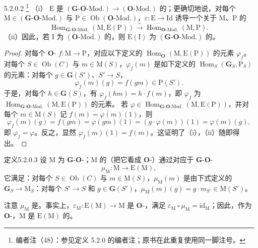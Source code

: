 \begin{SGAresult}{}{5.2.0.2}
\footnote{编者注（48）：参见定义 5.2.0 的编者注；原书在此重复使用同一脚注号。} （i） $\mathrm E$ 是 $(\mathbf G\text{-}\mathbf O\text{-}\mathrm{Mod.})\to(\mathbf O\text{-}\mathrm{Mod.})$ 的；更确切地说，对每个 $\mathrm M\in(\mathbf G\text{-}\mathbf O\text{-}\mathrm{Mod.})$ 与 $\mathrm P\in\operatorname{Ob}(\mathbf O\text{-}\mathrm{Mod.})$，$\varepsilon:\mathrm E\to\mathrm{Id}$ 诱导一个关于 $\mathrm M$、$\mathrm P$ 的
\[
\operatorname{Hom}_{\mathbf G\text{-}\mathbf O\text{-}\mathrm{Mod.}}(\mathrm M,\mathrm E(\mathrm P))\xrightarrow\sim\operatorname{Hom}_{\mathbf O\text{-}\mathrm{Mod.}}(\mathrm M,\mathrm P).
\]
（ii）因此，若 $\mathrm I$ 为 $(\mathbf O\text{-}\mathrm{Mod.})$ 的，则 $\mathrm E(\mathrm I)$ 为 $(\mathbf G\text{-}\mathbf O\text{-}\mathrm{Mod.})$ 的。
\end{SGAresult}
\begin{proof}
对每个 $\mathbf O$- $f:\mathrm M\to\mathrm P$，对应以下定义的 $\operatorname{Hom}_{\mathbf O}(\mathrm M,\mathrm E(\mathrm P))$ 的元素 $\varphi_f$。对每个 $S\in\operatorname{Ob}(C)$ 与 $m\in\mathrm M(S)$，$\varphi_f(m)$ 是如下定义的 $\operatorname{Hom}_S(\mathbf G_S,\mathrm P_S)$ 的元素：对每个 $g\in\mathbf G(S')$、$S'\to S$，
\[
\varphi_f(m)(g)=f(gm)\in\mathrm P(S').
\]
于是，对每个 $h\in\mathbf G(S)$，有 $\varphi_f(hm)=h\cdot f(m)$，即 $\varphi_f$ 为 $\operatorname{Hom}_{\mathbf G\text{-}\mathbf O\text{-}\mathrm{Mod.}}(\mathrm M,\mathrm E(\mathrm P))$ 的元素。
若 $\varphi\in\operatorname{Hom}_{\mathbf G\text{-}\mathbf O\text{-}\mathrm{Mod.}}(\mathrm M,\mathrm E(\mathrm P))$，并对每个 $m\in\mathrm M(S)$ 记 $f(m)=\varphi(m)(1)$，则
\[
\varphi_f(m)(g)=f(gm)=\varphi(gm)(1)=(g\cdot\varphi(m))(1)=\varphi(m)(g),
\]
即 $\varphi_f=\varphi$。反之，显然 $\varphi_f(m)(1)=f(m)$。这证明了（i），（ii）随即得出。
\end{proof}
\begin{SGAresult}{定义}{5.2.0.3}
设 $\mathrm M$ 为 $\mathbf G$-$\mathbf O$-；$\mathrm M$ 的（把它看成 $\mathbf O$-）通过对应于 $\mathbf G$-$\mathbf O$-
\[
\mu_{\mathrm M}:\mathrm M\longrightarrow\mathrm E(\mathrm M),
\]
它满足：对每个 $S\in\operatorname{Ob}(C)$ 与 $m\in\mathrm M(S)$，$\mu_{\mathrm M}(m)$ 是由下式定义的 $\mathbf G_S\to\mathrm M_S$：对每个 $S'\to S$ 和 $g\in\mathbf G(S')$，$\mu_{\mathrm M}(m)(g)=g\cdot m_{S'}\in\mathrm M(S')$。
\end{SGAresult}
注意 $\mu_{\mathrm M}$ 是。事实上，$\varepsilon_{\mathrm M}:\mathrm E(\mathrm M)\to\mathrm M$ 是 $\mathbf O$-，满足 $\varepsilon_{\mathrm M}\circ\mu_{\mathrm M}=\mathrm{id}_{\mathrm M}$；因此，作为 $\mathbf O$-，$\mathrm M$ 是 $\mathrm E(\mathrm M)$ 的。

